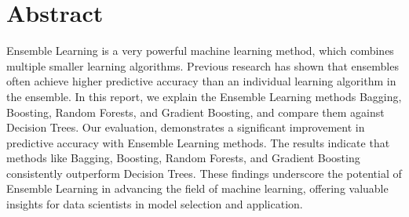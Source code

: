 \section*{Abstract}

Ensemble Learning is a very powerful machine learning method, which combines
multiple smaller learning algorithms. Previous research has shown that 
ensembles often achieve higher predictive accuracy than an individual learning
algorithm in the ensemble.
In this report, we explain the Ensemble Learning methods Bagging,
Boosting, Random Forests, and Gradient Boosting, and compare them against
Decision Trees.
Our evaluation, demonstrates a significant improvement in predictive accuracy
with Ensemble Learning methods. The results indicate that methods like Bagging,
Boosting, Random Forests, and Gradient Boosting consistently outperform Decision Trees.
These findings underscore the potential of Ensemble Learning in advancing the field of 
machine learning, offering valuable insights for data scientists in model selection and 
application.

